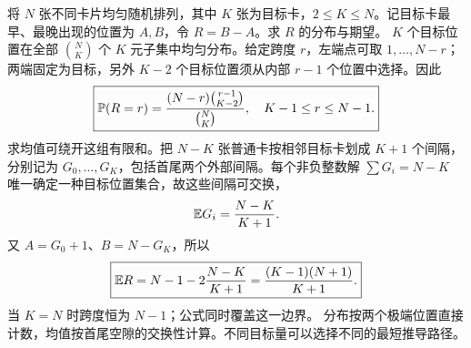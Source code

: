 将 $N$ 张不同卡片均匀随机排列，其中 $K$ 张为目标卡，$2\le K\le N$。记目标卡最早、最晚出现的位置为 $A,B$，令 $R=B-A$。求 $R$ 的分布与期望。
\solution $K$ 个目标位置在全部 $\binom NK$ 个 $K$ 元子集中均匀分布。给定跨度 $r$，左端点可取 $1,\ldots,N-r$；两端固定为目标，另外 $K-2$ 个目标位置须从内部 $r-1$ 个位置中选择。因此
\[
\boxed{\mathbb{P}(R=r)=\frac{(N-r)\binom{r-1}{K-2}}{\binom NK},
\quad K-1\le r\le N-1.}
\]
求均值可绕开这组有限和。把 $N-K$ 张普通卡按相邻目标卡划成 $K+1$ 个间隔，分别记为 $G_0,\ldots,G_K$，包括首尾两个外部间隔。每个非负整数解 $\sum G_i=N-K$ 唯一确定一种目标位置集合，故这些间隔可交换，
\[
\mathbb{E} G_i=\frac{N-K}{K+1}.
\]
又 $A=G_0+1$、$B=N-G_K$，所以
\[
\boxed{\mathbb{E} R=N-1-2\frac{N-K}{K+1}
=\frac{(K-1)(N+1)}{K+1}.}
\]
当 $K=N$ 时跨度恒为 $N-1$；公式同时覆盖这一边界。
\insight 分布按两个极端位置直接计数，均值按首尾空隙的交换性计算。不同目标量可以选择不同的最短推导路径。
